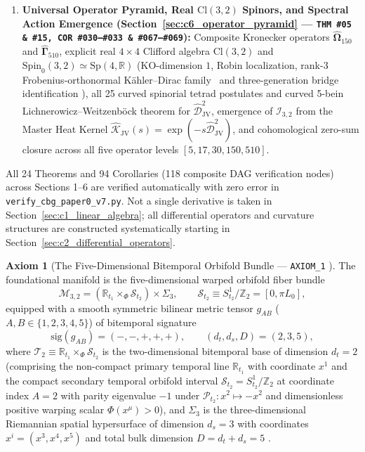 \documentclass[11pt,a4paper]{article}
\newcommand{\catA}{\text{\textbf{\textcolor{purple!80!black}{[A]}}}}
\newcommand{\catD}{\text{\textbf{\textcolor{blue!75!black}{[D]}}}}
\newcommand{\catH}{\text{\textbf{\textcolor{orange!80!black}{[H]}}}}
\theoremstyle{definition}
\newtheorem{axiom}{Axiom}[section]
\theoremstyle{plain}
\theoremstyle{remark}
\begin{document}
\begin{enumerate}[label=\textbf{Stage \arabic*.}, leftmargin=2.2cm]
  \item \textbf{Universal Operator Pyramid, Real $\mathrm{Cl}(3,2)$ Spinors, and Spectral Action Emergence (Section~\ref{sec:c6_operator_pyramid} --- \texttt{THM~\#05 \& \#15, COR~\#030--\#033 \& \#067--\#069}):} Composite Kronecker operators $\widehat{\mathbf{\Omega}}_{150}$ and $\widehat{\mathbf{\Gamma}}_{510}$, explicit real $4\times 4$ Clifford algebra $\mathrm{Cl}(3,2)$ and $\mathrm{Spin}_0(3,2) \simeq \mathrm{Sp}(4,\mathbb{R})$ (KO-dimension $1$, Robin localization, rank-$3$ Frobenius-orthonormal K\"ahler--Dirac family \catD\ and three-generation bridge identification \catH), all 25 curved spinorial tetrad postulates and curved 5-bein Lichnerowicz--Weitzenb\"ock theorem for $\widehat{\mathcal{D}}_{\mathrm{JV}}^2$, emergence of $\mathcal{I}_{3,2}$ from the Master Heat Kernel $\widehat{\mathcal{K}}_{\mathrm{JV}}(s) = \exp(-s\widehat{\mathcal{D}}_{\mathrm{JV}}^2)$, and cohomological zero-sum closure across all five operator levels $[5, 17, 30, 150, 510]$.
\end{enumerate}
All 24 Theorems and 94 Corollaries (118 composite DAG verification nodes) across Sections 1--6 are verified automatically with zero error in \texttt{verify\_cbg\_paper0\_v7.py}. Not a single derivative is taken in Section~\ref{sec:c1_linear_algebra}; all differential operators and curvature structures are constructed systematically starting in Section~\ref{sec:c2_differential_operators}.

\begin{axiom}[The Five-Dimensional Bitemporal Orbifold Bundle --- \texttt{AXIOM\_1} \catA]\label{ax:axiom_one}\label{ax:c1_manifold}
The foundational manifold is the five-dimensional warped orbifold fiber bundle
\begin{equation}\label{eq:c1_bundle_topology}
\mathcal{M}_{3,2} = \left(\mathbb{R}_{t_1} \times_{\Phi} \mathcal{S}_{t_2}\right) \times \Sigma_3, \qquad
\mathcal{S}_{t_2} \equiv S^1_{t_2}/\mathbb{Z}_2 = [0, \pi L_0],
\end{equation}
equipped with a smooth symmetric bilinear metric tensor $g_{AB}$ ($A,B \in \{1,2,3,4,5\}$) of bitemporal signature
\begin{equation}\label{eq:c1_metric_signature}
\mathrm{sig}\!\left(g_{AB}\right) = (-, -, +, +, +), \qquad
(d_t, d_s, D) = (2, 3, 5),
\end{equation}
where $\mathcal{T}_2 \equiv \mathbb{R}_{t_1} \times_{\Phi} \mathcal{S}_{t_2}$ is the two-dimensional bitemporal base of dimension $d_t = 2$ (comprising the non-compact primary temporal line $\mathbb{R}_{t_1}$ with coordinate $x^1$ and the compact secondary temporal orbifold interval $\mathcal{S}_{t_2} = S^1_{t_2}/\mathbb{Z}_2$ at coordinate index $A = 2$ with parity eigenvalue $-1$ under $\mathcal{P}_{t_2}: x^2 \mapsto -x^2$ and dimensionless positive warping scalar $\Phi(x^\mu) > 0$), and $\Sigma_3$ is the three-dimensional Riemannian spatial hypersurface of dimension $d_s = 3$ with coordinates $x^i = (x^3, x^4, x^5)$ and total bulk dimension $D = d_t + d_s = 5$ \catA.
\end{axiom}
\end{document}
